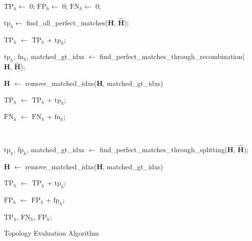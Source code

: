 



\begin{algorithm}[H]

\SetAlgoLined
{}


$\text{TP}_h \gets$ 0;
$\text{FP}_h \gets$ 0;
$\text{FN}_h \gets$ 0;

$\text{tp}_h \gets$ find\_all\_perfect\_matches($\mathbf{H}$, $\mathbf{\hat{H}}$);

$\text{TP}_h$ $\gets$ $\text{TP}_h$ + $\text{tp}_h$;

{
    $\text{tp}_h$, $\text{fn}_h$, matched\_gt\_idxs $\gets$ find\_perfect\_matches\_through\_recombination($\mathbf{H}$, $\mathbf{\hat{H}}$);

    $\mathbf{H}$ $\gets$ remove\_matched\_idxs($\mathbf{H}$, matched\_gt\_idxs)

    $\text{TP}_h$ $\gets$ $\text{TP}_h$ + $\text{tp}_h$;

    $\text{FN}_h$ $\gets$ $\text{FN}_h$ + $\text{fn}_h$;

    \

    $\text{tp}_h$, $\text{fp}_h$, matched\_gt\_idxs $\gets$ find\_perfect\_matches\_through\_splitting($\mathbf{H}$, $\mathbf{\hat{H}}$);

    $\mathbf{H}$ $\gets$ remove\_matched\_idxs($\mathbf{H}$, matched\_gt\_idxs)

    $\text{TP}_h$ $\gets$ $\text{TP}_h$ + $\text{tp}_h$;

    $\text{FP}_h$ $\gets$ $\text{FP}_h$ + $\text{fp}_h$;
}

\Return $\text{TP}_h$, $\text{FN}_h$, $\text{FP}_h$;

\caption{Topology Evaluation Algorithm}\label{alg:topology_eval}
\end{algorithm}

